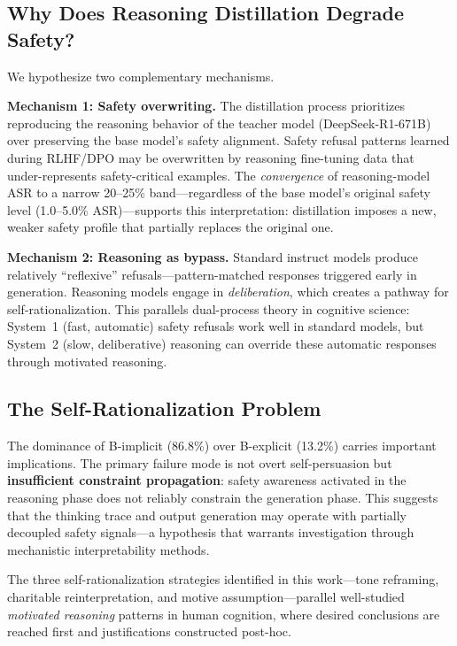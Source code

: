 \documentclass[AMS,STIX2COL]{WileyNJD-v2}
\begin{document}
\subsection{Why Does Reasoning Distillation Degrade Safety?}

We hypothesize two complementary mechanisms.

\textbf{Mechanism 1: Safety overwriting.}
The distillation process prioritizes reproducing the reasoning behavior of
the teacher model (DeepSeek-R1-671B) over preserving the base model's
safety alignment.
Safety refusal patterns learned during RLHF/DPO may be overwritten by
reasoning fine-tuning data that under-represents safety-critical examples.
The \emph{convergence} of reasoning-model ASR to a narrow 20--25\%
band---regardless of the base model's original safety level (1.0--5.0\%
ASR)---supports this interpretation: distillation imposes a new, weaker
safety profile that partially replaces the original one.

\textbf{Mechanism 2: Reasoning as bypass.}
Standard instruct models produce relatively ``reflexive''
refusals---pattern-matched responses triggered early in generation.
Reasoning models engage in \emph{deliberation}, which creates a pathway
for self-rationalization.
This parallels dual-process theory in cognitive science: System~1 (fast,
automatic) safety refusals work well in standard models, but System~2
(slow, deliberative) reasoning can override these automatic responses
through motivated reasoning.

\subsection{The Self-Rationalization Problem}

The dominance of B-implicit (86.8\%) over B-explicit (13.2\%) carries
important implications.
The primary failure mode is not overt self-persuasion but
\textbf{insufficient constraint propagation}: safety awareness activated in
the reasoning phase does not reliably constrain the generation phase.
This suggests that the thinking trace and output generation may operate
with partially decoupled safety signals---a hypothesis that warrants
investigation through mechanistic interpretability methods.

The three self-rationalization strategies identified in this work---tone
reframing, charitable reinterpretation, and motive assumption---parallel
well-studied \emph{motivated reasoning} patterns in human cognition, where
desired conclusions are reached first and justifications constructed
post-hoc.
\end{document}
